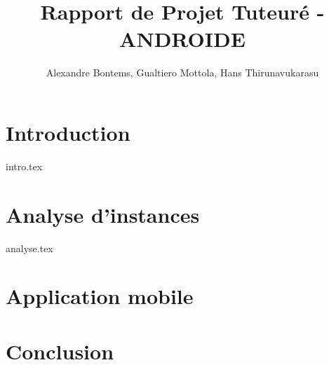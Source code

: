 \documentclass[a4paper, 10pt, titlepage]{article}
\title{Rapport de Projet Tuteuré - ANDROIDE}
\author{Alexandre Bontems, Gualtiero Mottola, Hans Thirunavukarasu}
\begin{document}
	
	\maketitle
	\tableofcontents
	\newpage

	\section{Introduction}
		{intro.tex}
	\section{Analyse d'instances}
		{analyse.tex}
	\section{Application mobile}
	
	\section{Conclusion}
	
	
\end{document}
